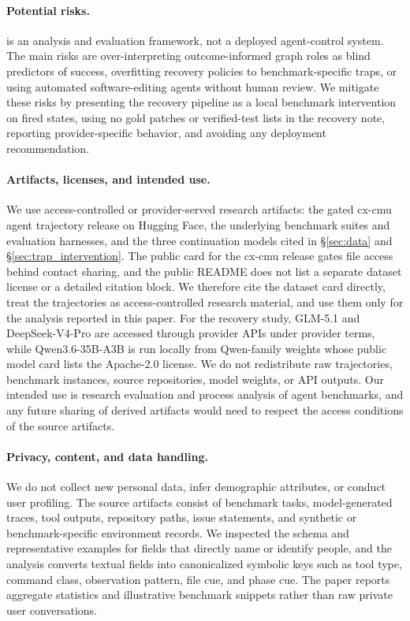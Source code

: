 \paragraph{Potential risks.}
\method{} is an analysis and evaluation framework, not a deployed agent-control system.
The main risks are over-interpreting outcome-informed graph roles as blind predictors of success, overfitting recovery policies to benchmark-specific traps, or using automated software-editing agents without human review.
We mitigate these risks by presenting the recovery pipeline as a local benchmark intervention on fired \swe{} states, using no gold patches or verified-test lists in the recovery note, reporting provider-specific behavior, and avoiding any deployment recommendation.

\paragraph{Artifacts, licenses, and intended use.}
We use access-controlled or provider-served research artifacts: the gated cx-cmu agent trajectory release on Hugging Face, the underlying benchmark suites and evaluation harnesses, and the three continuation models cited in \S\ref{sec:data} and \S\ref{sec:trap_intervention}.
The public card for the cx-cmu release gates file access behind contact sharing, and the public README does not list a separate dataset license or a detailed citation block.
We therefore cite the dataset card directly, treat the trajectories as access-controlled research material, and use them only for the analysis reported in this paper.
For the recovery study, GLM-5.1 and DeepSeek-V4-Pro are accessed through provider APIs under provider terms, while Qwen3.6-35B-A3B is run locally from Qwen-family weights whose public model card lists the Apache-2.0 license.
We do not redistribute raw trajectories, benchmark instances, source repositories, model weights, or API outputs.
Our intended use is research evaluation and process analysis of agent benchmarks, and any future sharing of derived artifacts would need to respect the access conditions of the source artifacts.

\paragraph{Privacy, content, and data handling.}
We do not collect new personal data, infer demographic attributes, or conduct user profiling.
The source artifacts consist of benchmark tasks, model-generated traces, tool outputs, repository paths, issue statements, and synthetic or benchmark-specific environment records.
We inspected the schema and representative examples for fields that directly name or identify people, and the analysis converts textual fields into canonicalized symbolic keys such as tool type, command class, observation pattern, file cue, and phase cue.
The paper reports aggregate statistics and illustrative benchmark snippets rather than raw private user conversations.

